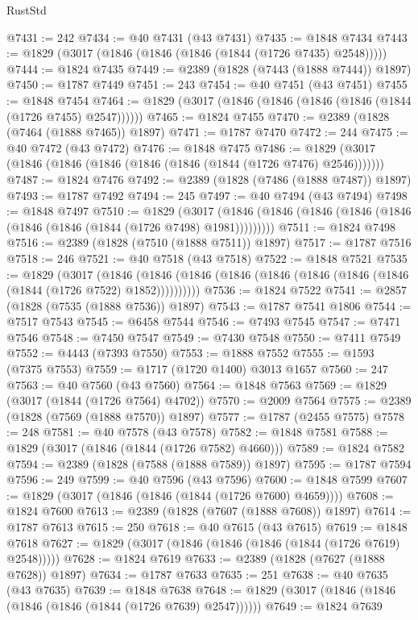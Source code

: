 \begin{lexlean}{RustStd}
\begin{coremodule}
@7431 := 242
@7434 := @40 @7431 (@43 @7431)
@7435 := @1848 @7434
@7443 := @1829 (@3017 (@1846 (@1846 (@1846 (@1844 (@1726 @7435) @2548)))))
@7444 := @1824 @7435
@7449 := @2389 (@1828 (@7443 (@1888 @7444)) @1897)
@7450 := @1787 @7449
@7451 := 243
@7454 := @40 @7451 (@43 @7451)
@7455 := @1848 @7454
@7464 := @1829 (@3017 (@1846 (@1846 (@1846 (@1846 (@1844 (@1726 @7455) @2547))))))
@7465 := @1824 @7455
@7470 := @2389 (@1828 (@7464 (@1888 @7465)) @1897)
@7471 := @1787 @7470
@7472 := 244
@7475 := @40 @7472 (@43 @7472)
@7476 := @1848 @7475
@7486 := @1829 (@3017 (@1846 (@1846 (@1846 (@1846 (@1846 (@1844 (@1726 @7476) @2546)))))))
@7487 := @1824 @7476
@7492 := @2389 (@1828 (@7486 (@1888 @7487)) @1897)
@7493 := @1787 @7492
@7494 := 245
@7497 := @40 @7494 (@43 @7494)
@7498 := @1848 @7497
@7510 := @1829
    (@3017 (@1846 (@1846 (@1846 (@1846 (@1846 (@1846 (@1846 (@1844 (@1726 @7498) @1981)))))))))
@7511 := @1824 @7498
@7516 := @2389 (@1828 (@7510 (@1888 @7511)) @1897)
@7517 := @1787 @7516
@7518 := 246
@7521 := @40 @7518 (@43 @7518)
@7522 := @1848 @7521
@7535 := @1829
    (@3017
      (@1846 (@1846 (@1846 (@1846 (@1846 (@1846 (@1846 (@1846 (@1844 (@1726 @7522) @1852))))))))))
@7536 := @1824 @7522
@7541 := @2857 (@1828 (@7535 (@1888 @7536)) @1897)
@7543 := @1787 @7541 @1806
@7544 := @7517 @7543
@7545 := @6458 @7544
@7546 := @7493 @7545
@7547 := @7471 @7546
@7548 := @7450 @7547
@7549 := @7430 @7548
@7550 := @7411 @7549
@7552 := @4443 (@7393 @7550)
@7553 := @1888 @7552
@7555 := @1593 (@7375 @7553)
@7559 := @1717 (@1720 @1400) @3013 @1657
@7560 := 247
@7563 := @40 @7560 (@43 @7560)
@7564 := @1848 @7563
@7569 := @1829 (@3017 (@1844 (@1726 @7564) @4702))
@7570 := @2009 @7564
@7575 := @2389 (@1828 (@7569 (@1888 @7570)) @1897)
@7577 := @1787 (@2455 @7575)
@7578 := 248
@7581 := @40 @7578 (@43 @7578)
@7582 := @1848 @7581
@7588 := @1829 (@3017 (@1846 (@1844 (@1726 @7582) @4660)))
@7589 := @1824 @7582
@7594 := @2389 (@1828 (@7588 (@1888 @7589)) @1897)
@7595 := @1787 @7594
@7596 := 249
@7599 := @40 @7596 (@43 @7596)
@7600 := @1848 @7599
@7607 := @1829 (@3017 (@1846 (@1846 (@1844 (@1726 @7600) @4659))))
@7608 := @1824 @7600
@7613 := @2389 (@1828 (@7607 (@1888 @7608)) @1897)
@7614 := @1787 @7613
@7615 := 250
@7618 := @40 @7615 (@43 @7615)
@7619 := @1848 @7618
@7627 := @1829 (@3017 (@1846 (@1846 (@1846 (@1844 (@1726 @7619) @2548)))))
@7628 := @1824 @7619
@7633 := @2389 (@1828 (@7627 (@1888 @7628)) @1897)
@7634 := @1787 @7633
@7635 := 251
@7638 := @40 @7635 (@43 @7635)
@7639 := @1848 @7638
@7648 := @1829 (@3017 (@1846 (@1846 (@1846 (@1846 (@1844 (@1726 @7639) @2547))))))
@7649 := @1824 @7639

\end{coremodule}
\end{lexlean}
